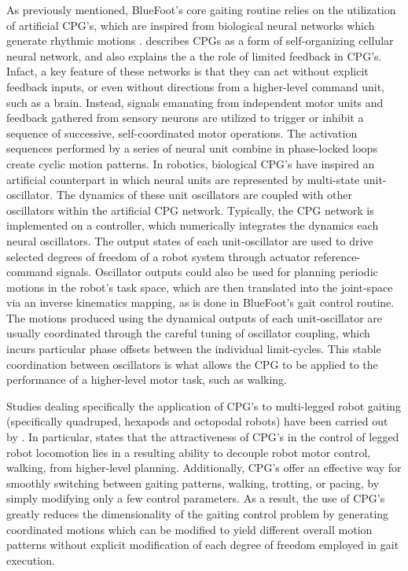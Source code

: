 		As previously mentioned, BlueFoot's core gaiting routine relies on the utilization of artificial CPG's, which are inspired from biological neural networks which generate rhythmic motions \cite{Ijspeert2008}. \cite{Arena2000} describes CPGs as a form of self-organizing cellular neural network, and also explains the a the role of limited feedback in CPG's. Infact, a key feature of these networks is that they can act without explicit feedback inputs, or even without directions from a higher-level command unit, such as a brain. Instead, signals emanating from independent motor units and feedback gathered from sensory neurons are utilized to trigger or inhibit a sequence of successive, self-coordinated motor operations. The activation sequences performed by a series of neural unit combine in phase-locked loops create cyclic motion patterns. In robotics, biological CPG's have inspired an artificial counterpart in which neural units are represented by multi-state unit-oscillator. The dynamics of these unit oscillators are coupled with other oscillators within the artificial CPG network. Typically, the CPG network is implemented on a controller, which numerically integrates the dynamics each neural oscillators. The output states of each unit-oscillator are used to drive selected degrees of freedom of a robot system through actuator reference-command signals. Oscillator outputs could also be used for planning periodic motions in the robot's task space, which are then translated into the joint-space via an inverse kinematics mapping, as is done in BlueFoot's gait control routine. The motions produced using the dynamical outputs of each unit-oscillator are usually coordinated through the careful tuning of oscillator coupling, which incurs particular phase offsets between the individual limit-cycles. This stable coordination between oscillators is what allows the CPG to be applied to the performance of a higher-level motor task, such as walking.

		Studies dealing specifically the application of CPG's to multi-legged robot gaiting (specifically quadruped, hexapods and octopodal robots) have been carried out by \cite{Arena2001,Klaassen2002,Arena2004,Inagaki2003,Inagaki2006,Billard2000,Brambilla2006,Buchli2006,Tsujita2001,Tsujita2004}.  In particular, \cite{Ijspeert2008} states that the attractiveness of CPG's in the control of legged robot locomotion lies in a resulting ability to decouple robot motor control, \IE walking, from higher-level planning. Additionally, CPG's offer an effective way for smoothly switching between gaiting patterns, \EG walking, trotting, or pacing, by simply modifying only a few control parameters. As a result, the use of CPG's greatly reduces the dimensionality of the gaiting control problem by generating coordinated motions which can be modified to yield different overall motion patterns without explicit modification of each degree of freedom employed in gait execution.

